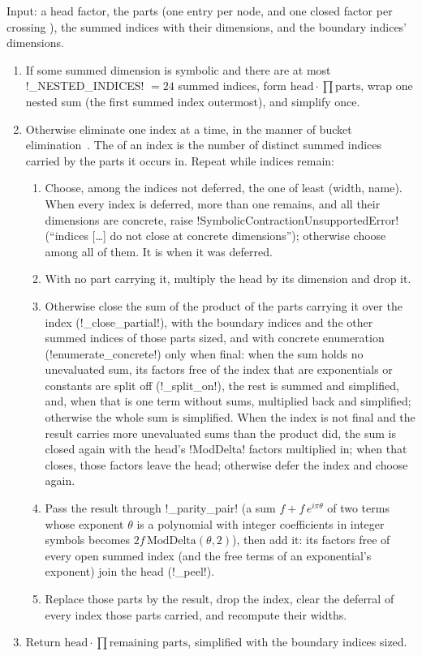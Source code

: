 \begin{algorithm}\label{alg:semantics-sum-out}
Input: a head factor, the parts (one entry per node, and one closed factor per crossing \bbox{}), the summed indices with their dimensions, and the boundary indices' dimensions.
\begin{enumerate}
\item If some summed dimension is symbolic and there are at most \py!_NESTED_INDICES! $=24$ summed indices, form $\text{head}\cdot\prod\text{parts}$, wrap one nested sum (the first summed index outermost), and simplify once.
\item Otherwise eliminate one index at a time, in the manner of bucket elimination~\cite{dechter1999bucket}. The  of an index is the number of distinct summed indices carried by the parts it occurs in. Repeat while indices remain:
  \begin{enumerate}
  \item Choose, among the indices not deferred, the one of least (width, name). When every index is deferred, more than one remains, and all their dimensions are concrete, raise \py!SymbolicContractionUnsupportedError! (``indices [\ldots] do not close at concrete dimensions''); otherwise choose among all of them. It is  when it was deferred.
  \item With no part carrying it, multiply the head by its dimension and drop it.
  \item Otherwise close the sum of the product of the parts carrying it over the index (\py!_close_partial!), with the boundary indices and the other summed indices of those parts sized, and with concrete enumeration (\py!enumerate_concrete!) only when final: when the sum holds no unevaluated sum, its factors free of the index that are exponentials or constants are split off (\py!_split_on!), the rest is summed and simplified, and, when that is one term without sums, multiplied back and simplified; otherwise the whole sum is simplified. When the index is not final and the result carries more unevaluated sums than the product did, the sum is closed again with the head's \py!ModDelta! factors multiplied in; when that closes, those factors leave the head; otherwise defer the index and choose again.
  \item Pass the result through \py!_parity_pair! (a sum $f+f\,e^{i\pi\theta}$ of two terms whose exponent $\theta$ is a polynomial with integer coefficients in integer symbols becomes $2f\,\mathrm{ModDelta}(\theta,2)$), then add it: its factors free of every open summed index (and the free terms of an exponential's exponent) join the head (\py!_peel!).
  \item Replace those parts by the result, drop the index, clear the deferral of every index those parts carried, and recompute their widths.
  \end{enumerate}
\item Return $\text{head}\cdot\prod\text{remaining parts}$, simplified with the boundary indices sized.
\end{enumerate}
\end{algorithm}

